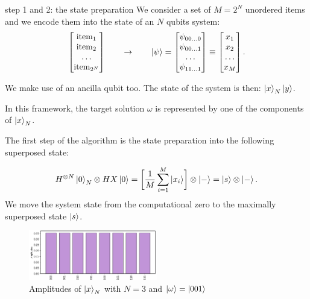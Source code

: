 \documentclass[aspectratio=169, 8pt, xcolor={svgnames}, hyperref={linkcolor=black}]{beamer}
\begin{document}
\begin{frame}{step 1 and 2: the state preparation}
We consider a set of $M=2^{N}$ unordered items and we encode them into the state of
an $N$ qubits system:
$$
\begin{bmatrix}
\text{item}_1 \\
\text{item}_2 \\
\dots \\
\text{item}_{2^N}
\end{bmatrix} \qquad \to \qquad
\ket{\psi} = \begin{bmatrix}
\psi_{00 \dots 0} \\
\psi_{00 \dots 1}  \\
\dots \\
\psi_{11 \dots 1}
\end{bmatrix}
\equiv
\begin{bmatrix}
x_1 \\
x_2  \\
\dots \\
x_M
\end{bmatrix} .
$$
\pause

We make use of an ancilla qubit too. The state of the system is then: $\ket{x}_N \ket{y}$. \pause

In this framework, the target solution $\omega$ is represented by one of the components of $\ket{x}_N$. \pause

The first step of the algorithm is the state preparation into the following superposed state:
\begin{multicols}{2}
$$ H^{\otimes N} \ket{0}_N \otimes HX \ket{0} = \biggl[ \frac{1}{M}\sum_{i=1}^{M} \ket{x_i} \biggr] \otimes \ket{-} = \ket{s}\otimes \ket{-}. $$
\textcolor{carnelian}{We move the system state from the computational zero
to the maximally superposed state $\ket{s}$.}

\begin{figure}
   \includegraphics[width=0.5\textwidth]{figures/state1.png}
   \caption*{Amplitudes of $\ket{x}_N$ with $N=3$ and $\ket{\omega} = \ket{001}$}
\end{figure}
\end{multicols}

\end{frame}
\end{document}
